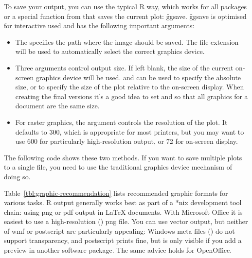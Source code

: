 To save your output, you can use the typical R way, which works for all packages or a special function from \ggplot that saves the current plot: \f{ggsave}. \f{ggsave} is optimised for interactive used and has the following important arguments:

\begin{itemize}
  \item The  specifies the path where the image should be saved.  The file extension will be used to automatically select the correct graphics device.
  
  \item Three arguments control output size.  If left blank, the size of the current on-screen graphics device will be used.   and  can be used to specify the absolute size, or  to specify the size of the plot relative to the on-screen display.  When creating the final versions it's a good idea to set  and  so that all graphics for a document are the same size.

  \item For raster graphics, the  argument controls the resolution of the plot.  It defaults to 300, which is appropriate for most printers, but you may want to use 600 for particularly high-resolution output, or 72 for on-screen display.
  
\end{itemize}

The following code shows these two methods. If you want to save multiple plots to a single file, you need to use the traditional graphics device mechanism of doing so.  

% 
% 

Table~\ref{tbl:graphic-recommendation} lists recommended graphic formats for various tasks.  R output generally works best as part of a *nix development tool chain: using png or pdf output in \LaTeX{} documents.  With Microsoft Office it is easiest to use a high-resolution () png file.  You can use vector output, but neither of wmf or postscript are particularly appealing: Windows meta files () do not support transparency, and postscript prints fine, but is only visible if you add a preview in another software package.  The same advice holds for OpenOffice.

